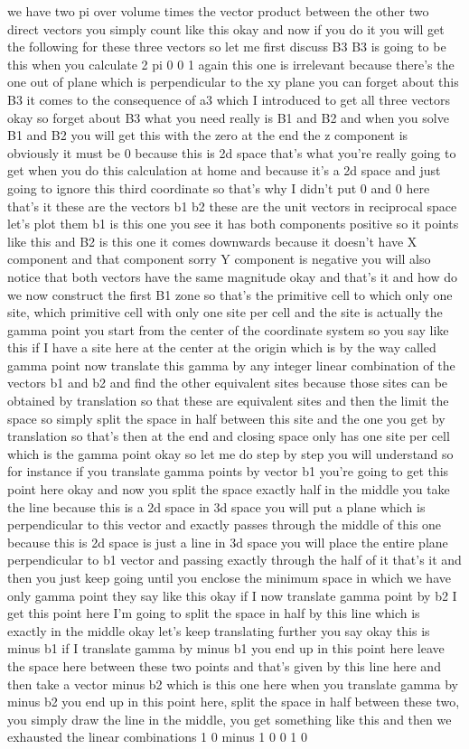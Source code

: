 we have two pi over volume times the vector product between the other two direct vectors you simply count like this okay and now if you do it you will get the following for these three vectors so let me first discuss B3 B3 is going to be this when you calculate 2 pi 0 0 1 again this one is irrelevant because there's the one out of plane which is perpendicular to the xy plane you can forget about this B3 it comes to the consequence of a3 which I introduced to get all three vectors okay so forget about B3 what you need really is B1 and B2 and when you solve B1 and B2 you will get this with the zero at the end the z component is obviously it must be 0 because this is 2d space that's what you're really going to get when you do this calculation at home and because it's a 2d space and just going to ignore this third coordinate so that's why I didn't put 0 and 0 here that's it these are the vectors b1 b2 these are the unit vectors in reciprocal space let's plot them b1 is this one you see it has both components positive so it points like this and B2 is this one it comes downwards because it doesn't have X component and that component sorry Y component is negative you will also notice that both vectors have the same magnitude okay and that's it and how do we now construct the first B1 zone so that's the primitive cell to which only one site, which primitive cell with only one site per cell and the site is actually the gamma point you start from the center of the coordinate system so you say like this if I have a site here at the center at the origin which is by the way called gamma point now translate this gamma by any integer linear combination of the vectors b1 and b2 and find the other equivalent sites because those sites can be obtained by translation so that these are equivalent sites and then the limit the space so simply split the space in half between this site and the one you get by translation so that's then at the end and closing space only has one site per cell which is the gamma point okay so let me do step by step you will understand so for instance if you translate gamma points by vector b1 you're going to get this point here okay and now you split the space exactly half in the middle you take the line because this is a 2d space in 3d space you will put a plane which is perpendicular to this vector and exactly passes through the middle of this one because this is 2d space is just a line in 3d space you will place the entire plane perpendicular to b1 vector and passing exactly through the half of it that's it and then you just keep going until you enclose the minimum space in which we have only gamma point they say like this okay if I now translate gamma point by b2 I get this point here I'm going to split the space in half by this line which is exactly in the middle okay let's keep translating further you say okay this is minus b1 if I translate gamma by minus b1 you end up in this point here leave the space here between these two points and that's given by this line here and then take a vector minus b2 which is this one here when you translate gamma by minus b2 you end up in this point here, split the space in half between these two, you simply draw the line in the middle, you get something like this and then we exhausted the linear combinations 1 0 minus 1 0 0 1 0 